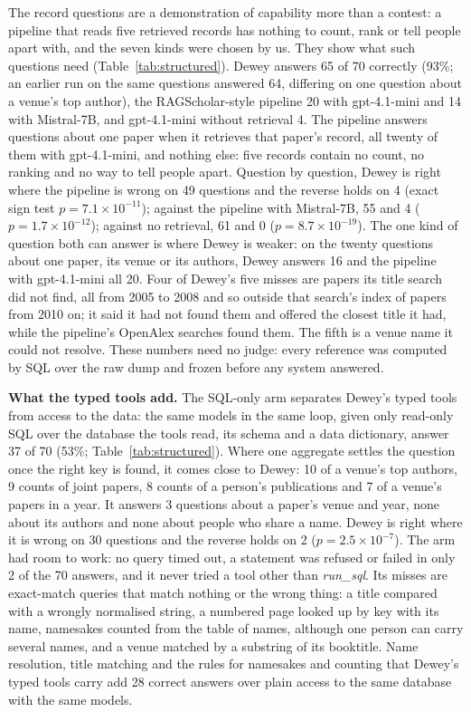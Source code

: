 \documentclass[conference]{IEEEtran}
\begin{document}
The record questions are a demonstration of capability more than a contest: a pipeline that reads five
retrieved records has nothing to count, rank or tell people apart with, and the seven kinds were chosen by
us. They show what such questions need (Table~\ref{tab:structured}). Dewey answers 65 of 70 correctly (93\%; an earlier run on the same questions answered 64, differing on
one question about a venue's top author), the RAGScholar-style pipeline 20 with gpt-4.1-mini and 14 with
Mistral-7B, and gpt-4.1-mini without retrieval 4. The pipeline answers questions about one paper when it retrieves that
paper's record, all twenty of them with gpt-4.1-mini, and nothing else: five records contain no count, no
ranking and no way to tell people apart. Question by question, Dewey is right where the pipeline is wrong
on 49 questions and the reverse holds on 4 (exact sign test $p=7.1\times10^{-11}$); against the pipeline
with Mistral-7B, 55 and 4 ($p=1.7\times10^{-12}$); against no retrieval, 61 and 0
($p=8.7\times10^{-19}$). The one kind of question both can answer is where Dewey is weaker: on the
twenty questions about one paper, its venue or its authors, Dewey answers 16 and the pipeline with
gpt-4.1-mini all 20. Four of Dewey's five misses are papers its title search did not find, all from 2005 to 2008 and so
outside that search's index of papers from 2010 on; it said it had not found them and offered the closest
title it had, while the pipeline's OpenAlex searches found them. The fifth is a venue name it could not resolve. These numbers need no judge: every reference
was computed by SQL over the raw dump and frozen before any system answered.

\textbf{What the typed tools add.} The SQL-only arm separates Dewey's typed tools from access to the data:
the same models in the same loop, given only read-only SQL over the database the tools read, its schema
and a data dictionary, answer 37 of 70 (53\%; Table~\ref{tab:structured}). Where one aggregate settles the
question once the right key is found, it comes close to Dewey: 10 of a venue's top authors, 9 counts of
joint papers, 8 counts of a person's publications and 7 of a venue's papers in a year. It answers 3
questions about a paper's venue and year, none about its authors and none about people who share a name.
Dewey is right where it is wrong on 30 questions and the reverse holds on 2 ($p=2.5\times10^{-7}$). The
arm had room to work: no query timed out, a statement was refused or failed in only 2 of the 70 answers,
and it never tried a tool other than \emph{run\_sql}. Its misses are exact-match queries that match
nothing or the wrong thing: a title compared with a wrongly normalised string, a numbered page looked up
by key with its name, namesakes counted from the table of names, although one person can carry several
names, and a venue matched by a substring of its booktitle. Name resolution, title matching and the
rules for namesakes and counting that Dewey's typed tools carry add 28 correct answers over plain access to
the same database with the same models.
\end{document}
